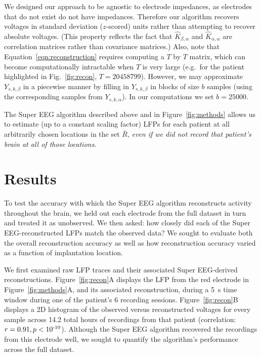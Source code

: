 \documentclass[12pt]{article}
\begin{document}
We designed our approach to be agnostic to electrode impedances, as
electrodes that do not exist do not have impedances.  Therefore our
algorithm recovers voltages in standard deviation ($z$-scored) units
rather than attempting to recover absolute voltages. (This property
reflects the fact that $\hat{K}_{\beta, \alpha}$ and
$\hat{K}_{\alpha, \alpha}$ are correlation matrices rather than
covariance matrices.)  Also, note that
Equation~\ref{eqn:reconstruction} requires computing a $T$ by $T$
matrix, which can become computationally intractable when $T$ is very
large (e.g.\ for the patient highlighted in Fig.~\ref{fig:recon}, $T = 20458799$). However, we may approximate $Y_{s,k,\beta}$ in a piecewise
manner by filling in $Y_{s,k,\beta}$ in blocks of size $b$ samples
(using the corresponding samples from $Y_{s, k, \alpha}$).  In our
computations we set $b = 25000$.

The Super EEG algorithm described above and in
Figure~\ref{fig:methods} allows us to estimate (up to a constant
scaling factor) LFPs for each patient at all arbitrarily chosen
locations in the set $\bar{R}$, \textit{even if we did not record that
  patient's brain at all of those locations}.

\section*{Results}
To test the accuracy with which the Super EEG algorithm reconstructs activity throughout the brain, we held out each electrode from the full
dataset in turn and treated it as unobserved. We then asked: how
closely did each of the Super EEG-reconstructed LFPs match the
observed data?  We sought to evaluate both the overall reconstruction
accuracy as well as how reconstruction accuracy varied as a function
of implantation location.

We first examined raw LFP traces and their associated Super
EEG-derived reconstructions.  Figure~\ref{fig:recon}A displays the
LFP from the red electrode in Figure~\ref{fig:methods}A, and its
associated reconstruction, during a 5~s time window during one of the
patient's 6 recording sessions.  Figure~\ref{fig:recon}B displays a 2D
histogram of the observed versus reconstructed voltages for every
sample across 14.2 total hours of recordings from that patient (correlation:
$r = 0.91, p < 10\textsuperscript{-10}$).  Although the Super EEG
algorithm recovered the recordings from this electrode well, we sought to
quantify the algorithm's performance across the full dataset.
\end{document}
